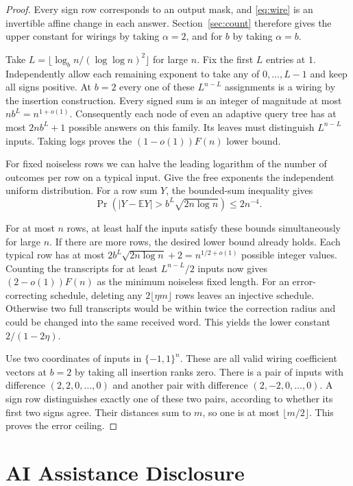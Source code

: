 \documentclass[11pt,letterpaper]{article}
\numberwithin{equation}{section}
\begin{document}
\begin{proof}

Every sign row corresponds to an output mask, and \eqref{eq:wire} is an invertible affine
change in each answer. Section~\ref{sec:count} therefore gives the upper constant for wirings
by taking $\alpha=2$, and for $b$ by taking $\alpha=b$.

Take $L=\lfloor\log_b n/(\log\log n)^2\rfloor$ for large $n$. Fix the first $L$ entries at
$1$. Independently allow each remaining exponent to take any of $0,\ldots,L-1$ and keep all
signs positive. At $b=2$ every one of these $L^{n-L}$ assignments is a wiring by the insertion
construction. Every signed sum is an integer of magnitude at most $n b^L=n^{1+o(1)}$.
Consequently each node of even an adaptive query tree has at most $2nb^L+1$ possible answers
on this family. Its leaves must distinguish $L^{n-L}$ inputs. Taking logs proves the
$(1-o(1))F(n)$ lower bound.

For fixed noiseless rows we can halve the leading logarithm of the number of outcomes per row
on a typical input. Give the free exponents the independent uniform distribution. For a row
sum $Y$, the bounded-sum inequality gives
\[
\Pr\!\left(\lvert Y-\mathbb EY\rvert>b^L\sqrt{2n\log n}\right)\le 2n^{-4}.
\]

For at most $n$ rows, at least half the inputs satisfy these bounds simultaneously for large
$n$. If there are more rows, the desired lower bound already holds. Each typical row has at
most $2b^L\sqrt{2n\log n}+2=n^{1/2+o(1)}$ possible integer values. Counting the transcripts
for at least $L^{n-L}/2$ inputs now gives $(2-o(1))F(n)$ as the minimum noiseless fixed
length. For an error-correcting schedule, deleting any $2\lfloor\eta m\rfloor$ rows leaves an
injective schedule. Otherwise two full transcripts would be within twice the correction radius
and could be changed into the same received word. This yields the lower constant
$2/(1-2\eta)$.

Use two coordinates of inputs in $\{-1,1\}^n$. These are all valid wiring coefficient vectors
at $b=2$ by taking all insertion ranks zero. There is a pair of inputs with difference
$(2,2,0,\ldots,0)$ and another pair with difference $(2,-2,0,\ldots,0)$. A sign row
distinguishes exactly one of these two pairs, according to whether its first two signs agree.
Their distances sum to $m$, so one is at most $\lfloor m/2\rfloor$. This proves the error
ceiling.
\end{proof}

\section*{AI Assistance Disclosure}
\end{document}
